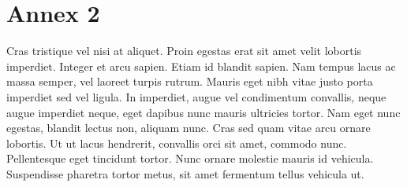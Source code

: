 \documentclass{jdmdh}
\begin{document}
\section{Annex 2}
Cras tristique vel nisi at aliquet. Proin egestas erat sit amet velit lobortis imperdiet. Integer et arcu sapien. Etiam id blandit
sapien. Nam tempus lacus ac massa semper, vel laoreet turpis rutrum. Mauris eget nibh vitae justo porta imperdiet sed vel
ligula. In imperdiet, augue vel condimentum convallis, neque augue imperdiet neque, eget dapibus nunc mauris ultricies
tortor. Nam eget nunc egestas, blandit lectus non, aliquam nunc. Cras sed quam vitae arcu ornare lobortis. Ut ut lacus
hendrerit, convallis orci sit amet, commodo nunc. Pellentesque eget tincidunt tortor. Nunc ornare molestie mauris id vehicula.
Suspendisse pharetra tortor metus, sit amet fermentum tellus vehicula ut.
\end{document}
